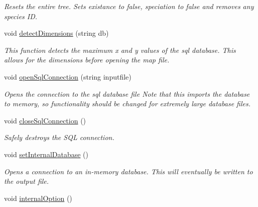 \begin{DoxyCompactItemize}
\begin{DoxyCompactList}\small\item\em Resets the entire tree. Sets existance to false, speciation to false and removes any species ID. \end{DoxyCompactList}\item 
void \hyperlink{class_community_a579c5f423fc2461838a80baf6b396310}{detect\+Dimensions} (string db)
\begin{DoxyCompactList}\small\item\em This function detects the maximum x and y values of the sql database. This allows for the dimensions before opening the map file. \end{DoxyCompactList}\item 
void \hyperlink{class_community_a389c35f39ed73eb1e5dc1476c220c140}{open\+Sql\+Connection} (string inputfile)
\begin{DoxyCompactList}\small\item\em Opens the connection to the sql database file Note that this imports the database to memory, so functionality should be changed for extremely large database files. \end{DoxyCompactList}\item 
void \hyperlink{class_community_ade889a6305f23cd5fd034a65134d7408}{close\+Sql\+Connection} ()\hypertarget{class_community_ade889a6305f23cd5fd034a65134d7408}{}\label{class_community_ade889a6305f23cd5fd034a65134d7408}

\begin{DoxyCompactList}\small\item\em Safely destroys the S\+QL connection. \end{DoxyCompactList}\item 
void \hyperlink{class_community_acba6b894e62ad4ecccbcf86f064ebc46}{set\+Internal\+Database} ()\hypertarget{class_community_acba6b894e62ad4ecccbcf86f064ebc46}{}\label{class_community_acba6b894e62ad4ecccbcf86f064ebc46}

\begin{DoxyCompactList}\small\item\em Opens a connection to an in-\/memory database. This will eventually be written to the output file. \end{DoxyCompactList}\item 
void \hyperlink{class_community_a527f03120e4cb211e466cab7e405ba9a}{internal\+Option} ()\hypertarget{class_community_a527f03120e4cb211e466cab7e405ba9a}{}\label{class_community_a527f03120e4cb211e466cab7e405ba9a}


\end{DoxyCompactItemize}
